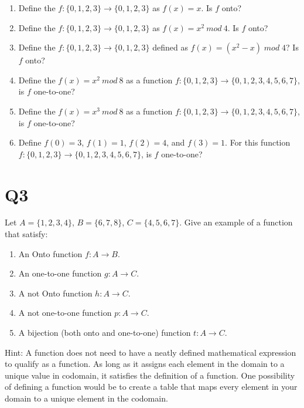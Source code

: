 \documentclass[12pt]{exam}
\begin{document}
\begin{enumerate}
    \item Define the $f : \{0, 1, 2, 3\} \rightarrow \{0, 1, 2, 3\}$ as $f(x) = x$. Is $f$ onto?
    \item Define the $f : \{0, 1, 2, 3\} \rightarrow \{0, 1, 2, 3\}$ as $f(x) = x^2~mod~4$. Is $f$ onto?
    \item Define the $f : \{0, 1, 2, 3\} \rightarrow \{0, 1, 2, 3\}$ defined as $f(x) = (x^2 - x)\;mod\;4$? Is $f$ onto?
    \item Define the $f(x) = x^2~mod~8$ as a function $f : \{0, 1, 2, 3\} \rightarrow \{0, 1, 2, 3 , 4 , 5 , 6 , 7\}$, is $f$ one-to-one?
    \item Define the $f(x) = x^3~mod~8$ as a function $f : \{0, 1, 2, 3\} \rightarrow \{0, 1, 2, 3,4, 5, 6, 7\}$, is $f$ one-to-one?
    \item Define $f(0) = 3$, $f(1) = 1$, $f(2) = 4$, and $f(3) = 1$. For this function $f : \{0, 1, 2, 3\} \rightarrow \{0, 1,2, 3, 4, 5, 6, 7\}$, is $f$ one-to-one?
\end{enumerate}


\section{Q3}

Let $A = \{1, 2, 3, 4\}$, $B= \{ 6,7,8\}$, $C=\{4,5,6,7\}$.
Give an example of a function that satisfy:
\begin{enumerate}
    \item An Onto function $f: A \rightarrow B$.
    \item An one-to-one function $g: A \rightarrow C$.
    \item A not Onto function $h: A \rightarrow C$.
    \item A not one-to-one function $p: A \rightarrow C$.
    \item A bijection (both onto and one-to-one) function $t: A \rightarrow C$. 
\end{enumerate}

Hint: A function does not need to have a neatly defined mathematical expression to qualify as a function. As long as it assigns each element in the domain to a unique value in codomain, it satisfies the definition of a function. One possibility of defining a function would be to create a table that maps every element in your domain to a unique element in the codomain.
\end{document}
